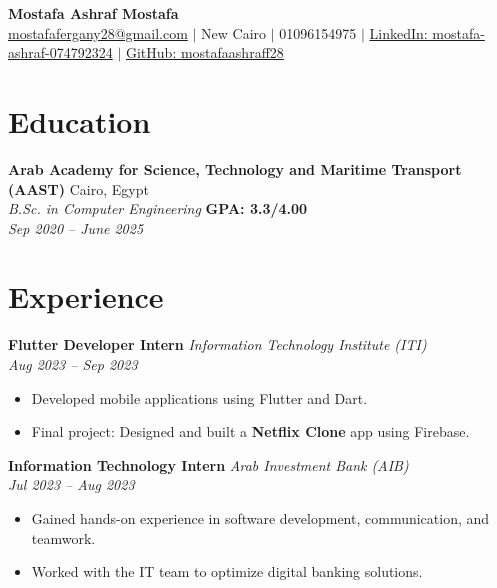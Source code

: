 \documentclass[letterpaper,10.5pt]{article}
\begin{document}
\begin{center}
    {\Huge \textbf{Mostafa Ashraf Mostafa}} \\ \vspace{5pt}
    \small
    \href{mailto:mostafafergany28@gmail.com}{mostafafergany28@gmail.com} 
    $|$ New Cairo
    $|$ 01096154975
    $|$ \href{https://www.linkedin.com/in/mostafa-ashraf-074792324}{LinkedIn: mostafa-ashraf-074792324}
    $|$ \href{https://github.com/mostafaashraff28}{GitHub: mostafaashraff28}
\end{center}

\section{Education}
\textbf{Arab Academy for Science, Technology and Maritime Transport (AAST)} \hfill Cairo, Egypt \\
\textit{B.Sc. in Computer Engineering} \hfill \textbf{GPA: 3.3/4.00} \\
\textit{Sep 2020 -- June 2025}

\section{Experience}
\textbf{Flutter Developer Intern} \hfill \textit{Information Technology Institute (ITI)} \\
\textit{Aug 2023 -- Sep 2023} \\
\begin{itemize}[leftmargin=*]
    \item Developed mobile applications using Flutter and Dart.
    \item Final project: Designed and built a \textbf{Netflix Clone} app using Firebase.
\end{itemize}

\textbf{Information Technology Intern} \hfill \textit{Arab Investment Bank (AIB)} \\
\textit{Jul 2023 -- Aug 2023} \\
\begin{itemize}[leftmargin=*]
    \item Gained hands-on experience in software development, communication, and teamwork.
    \item Worked with the IT team to optimize digital banking solutions.
\end{itemize}

\end{document}
